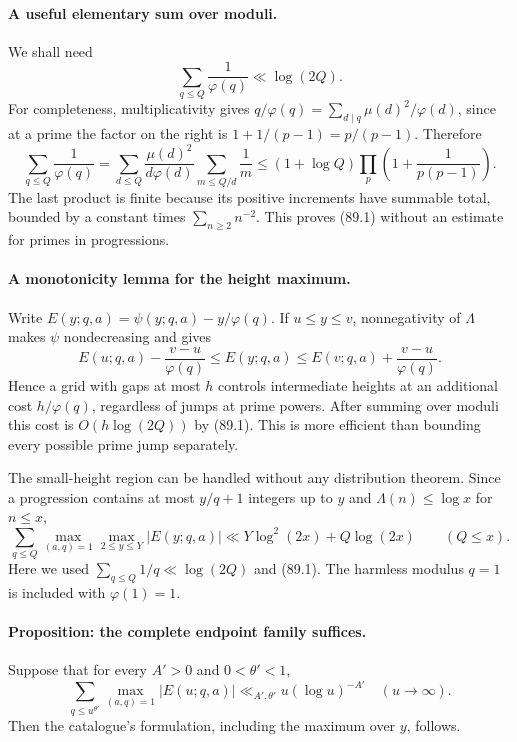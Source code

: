 \documentclass[11pt]{article}
\begin{document}
\paragraph{A useful elementary sum over moduli.}
We shall need
\[
                         \sum_{q\leq Q}\frac1{\varphi(q)}\ll\log(2Q).
                                                               \tag{89.1}
\]
For completeness, multiplicativity gives
$q/\varphi(q)=\sum_{d\mid q}\mu(d)^2/\varphi(d)$, since at a prime
the factor on the right is $1+1/(p-1)=p/(p-1)$. Therefore
\[
 \sum_{q\leq Q}\frac1{\varphi(q)}
 =\sum_{d\leq Q}\frac{\mu(d)^2}{d\varphi(d)}
                       \sum_{m\leq Q/d}\frac1m
 \leq(1+\log Q)\prod_p\left(1+\frac1{p(p-1)}\right).
\]
The last product is finite because its positive increments have summable
total, bounded by a constant times $\sum_{n\geq2}n^{-2}$.
This proves (89.1) without an estimate for primes in progressions.

\paragraph{A monotonicity lemma for the height maximum.}
Write $E(y;q,a)=\psi(y;q,a)-y/\varphi(q)$. If $u\leq y\leq v$,
nonnegativity of $\Lambda$ makes $\psi$ nondecreasing and gives
\[
 E(u;q,a)-\frac{v-u}{\varphi(q)}
 \leq E(y;q,a)\leq
 E(v;q,a)+\frac{v-u}{\varphi(q)}.                        \tag{89.2}
\]
Hence a grid with gaps at most $h$ controls intermediate heights at an
additional cost $h/\varphi(q)$, regardless of jumps at prime powers.
After summing over moduli this cost is $O(h\log(2Q))$ by (89.1).
This is more efficient than bounding every possible prime jump separately.

The small-height region can be handled without any distribution theorem.
Since a progression contains at most $y/q+1$ integers up to $y$ and
$\Lambda(n)\leq\log x$ for $n\leq x$,
\[
 \sum_{q\leq Q}\max_{(a,q)=1}\max_{2\leq y\leq Y}|E(y;q,a)|
                \ll Y\log^2(2x)+Q\log(2x)\qquad(Q\leq x).
                                                               \tag{89.3}
\]
Here we used $\sum_{q\leq Q}1/q\ll\log(2Q)$ and (89.1).
The harmless modulus $q=1$ is included with $\varphi(1)=1$.

\paragraph{Proposition: the complete endpoint family suffices.}
Suppose that for every $A'>0$ and $0<\theta'<1$,
\[
 \sum_{q\leq u^{\theta'}}\max_{(a,q)=1}|E(u;q,a)|
                    \ll_{A',\theta'}u(\log u)^{-A'}
 \quad(u\to\infty).                                   \tag{89.4}
\]
Then the catalogue's formulation, including the maximum over $y$, follows.
\end{document}
